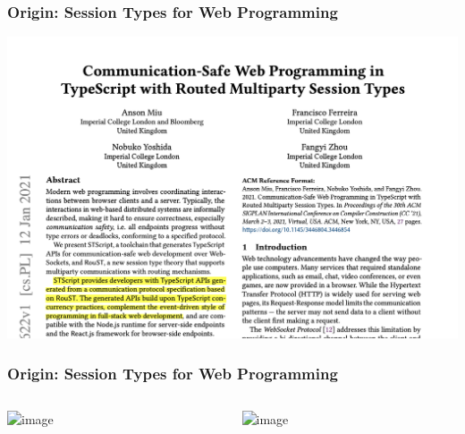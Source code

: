 \documentclass[dvipsnames,aspectratio=169,pdftex]{beamer}
\begin{document}
\begin{frame}
  \frametitle{Origin: Session Types for Web Programming}
  \begin{center}
    \includegraphics[scale=0.3]{images/routed-titlepage}
  \end{center}
\end{frame}
\begin{frame}
  \frametitle{Origin: Session Types for Web Programming}
  \begin{columns}
    \begin{column}{0.49\textwidth}
      \begin{center}
        \includegraphics<+->[scale=0.45]{images/routed-callback2}
      \end{center}
    \end{column}
    \begin{column}{0.49\textwidth}
      \includegraphics<+->[scale=0.45]{images/handler-interface}
    \end{column}
  \end{columns}
\end{frame}
\end{document}
